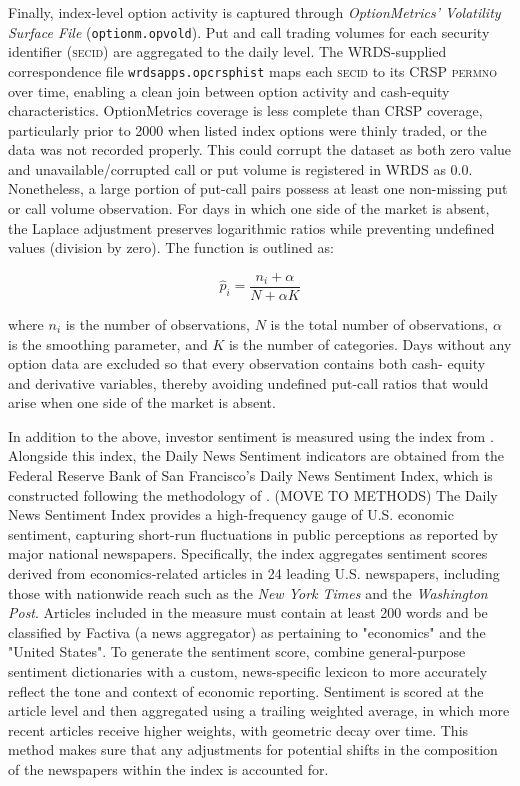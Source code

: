 Finally, index-level option activity is captured through \emph{OptionMetrics' Volatility Surface File} (\texttt{optionm.opvold}). Put and call trading volumes for each security identifier (\textsc{secid}) are aggregated to the daily level. The WRDS-supplied correspondence file \texttt{wrdsapps.opcrsphist} maps each \textsc{secid} to its CRSP \textsc{permno} over time, enabling a clean join between option activity and cash-equity characteristics. OptionMetrics coverage is less complete than CRSP coverage, particularly prior to 2000 when listed index options were thinly traded, or the data was not recorded properly. This could corrupt the dataset as both zero value and unavailable/corrupted call or put volume is registered in WRDS as 0.0. Nonetheless, a large portion of put-call pairs possess at least one non-missing put or call volume observation. For days in which one side of the market is absent, the Laplace adjustment preserves logarithmic ratios while preventing undefined values (division by zero). The function is outlined as:

\begin{equation}
     \hat{p}_i = \frac{n_i + \alpha}{N + \alpha K}
     \end{equation}

where $n_i$ is the number of observations, $N$ is the total number of observations, $\alpha$ is the smoothing parameter, and $K$ is the number of categories. Days without any option data are excluded so that every observation contains both cash- equity and derivative variables, thereby avoiding undefined put-call ratios that would arise when one side of the market is absent.

In addition to the above, investor sentiment is measured using the index from . Alongside this index, the Daily News Sentiment indicators are obtained from the Federal Reserve Bank of San Francisco's Daily News Sentiment Index, which is constructed following the methodology of . (MOVE TO METHODS) The Daily News Sentiment Index provides a high-frequency gauge of U.S. economic sentiment, capturing short-run fluctuations in public perceptions as reported by major national newspapers. Specifically, the index aggregates sentiment scores derived from economics-related articles in 24 leading U.S. newspapers, including those with nationwide reach such as the \emph{New York Times} and the \emph{Washington Post}. Articles included in the measure must contain at least 200 words and be classified by Factiva (a news aggregator) as pertaining to "economics" and the "United States". To generate the sentiment score,  combine general-purpose sentiment dictionaries with a custom, news-specific lexicon to more accurately reflect the tone and context of economic reporting. Sentiment is scored at the article level and then aggregated using a trailing weighted average, in which more recent articles receive higher weights, with geometric decay over time. This method makes sure that any adjustments for potential shifts in the composition of the newspapers within the index is accounted for.

